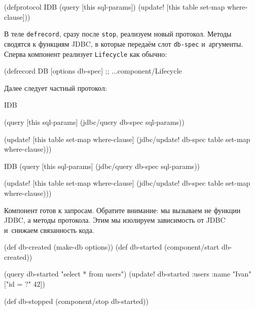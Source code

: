 \else

\begin{english}
  \begin{clojure}
(defprotocol IDB
  (query [this sql-params])
  (update! [this table set-map where-clause]))
  \end{clojure}
\end{english}

\fi

В теле \verb|defrecord|, сразу после \verb|stop|, реализуем новый
протокол. Методы сводятся к функциям JDBC, в которые передаём слот
\verb|db-spec| и~аргументы. Сперва компонент реализует \verb|Lifecycle| как
обычно:

\begin{english}
  \begin{clojure}
(defrecord DB [options db-spec]
  ;; ...component/Lifecycle
  \end{clojure}
\end{english}

\noindent
Далее следует частный протокол:

\ifx\DEVICETYPE\MOBILE

\begin{english}
  \begin{clojure}
  IDB

  (query [this sql-params]
    (jdbc/query db-spec sql-params))

  (update!
    [this table set-map where-clause]
    (jdbc/update! db-spec
      table set-map where-clause)))
  \end{clojure}
\end{english}

\else

\begin{english}
  \begin{clojure}
  IDB
  (query [this sql-params]
    (jdbc/query db-spec sql-params))

  (update! [this table set-map where-clause]
    (jdbc/update! db-spec table set-map where-clause)))
  \end{clojure}
\end{english}

\fi

Компонент готов к запросам. Обратите внимание: мы вызываем не функции JDBC, а
методы протокола. Этим мы изолируем зависимость от JDBC и~снижаем связанность
кода.

\ifx\DEVICETYPE\MOBILE

\begin{english}
  \begin{clojure}
(def db-created (make-db options))
(def db-started
  (component/start db-created))

(query db-started "select * from users")
(update! db-started
  :users {:name "Ivan"} ["id = ?" 42])

(def db-stopped
  (component/stop db-started))
  \end{clojure}
\end{english}

